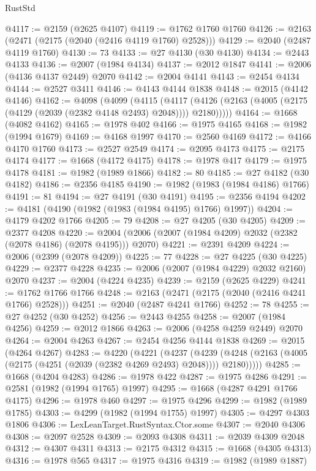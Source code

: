\begin{lexlean}{RustStd}
\begin{coremodule}
@4117 := @2159 (@2625 @4107)
@4119 := @1762 @1760 @1760
@4126 := @2163 (@2471 (@2175 (@2040 (@2416 @4119 @1760) @2528)))
@4129 := @2040 (@2487 @4119 @1760)
@4130 := 73
@4133 := @27 @4130 (@30 @4130)
@4134 := @2443 @4133
@4136 := @2007 (@1984 @4134)
@4137 := @2012 @1847
@4141 := @2006 (@4136 @4137 @2449) @2070
@4142 := @2004 @4141
@4143 := @2454 @4134
@4144 := @2527 @3411
@4146 := @4143 @4144 @1838
@4148 := @2015 (@4142 @4146)
@4162 := @4098
    (@4099
      (@4115
        (@4117 (@4126 (@2163 (@4005 (@2175 (@4129 (@2039 (@2382 @4148 @2493) @2048)))) @2180)))))
@4164 := @1668 (@4082 @4162)
@4165 := @1978 @402
@4166 := @1975 @4165
@4168 := @1982 (@1994 @1679)
@4169 := @4168 @1997
@4170 := @2560 @4169
@4172 := @4166 @4170 @1760
@4173 := @2527 @2549
@4174 := @2095 @4173
@4175 := @2175 @4174
@4177 := @1668 (@4172 @4175)
@4178 := @1978 @417
@4179 := @1975 @4178
@4181 := @1982 (@1989 @1866)
@4182 := 80
@4185 := @27 @4182 (@30 @4182)
@4186 := @2356 @4185
@4190 := @1982 (@1983 (@1984 @4186) @1766)
@4191 := 81
@4194 := @27 @4191 (@30 @4191)
@4195 := @2356 @4194
@4202 := @4181 (@4190 (@1982 (@1983 (@1984 @4195) @1766) @1997))
@4204 := @4179 @4202 @1766
@4205 := 79
@4208 := @27 @4205 (@30 @4205)
@4209 := @2377 @4208
@4220 := @2004 (@2006 (@2007 (@1984 @4209) @2032 (@2382 (@2078 @4186) (@2078 @4195))) @2070)
@4221 := @2391 @4209
@4224 := @2006 (@2399 (@2078 @4209))
@4225 := 77
@4228 := @27 @4225 (@30 @4225)
@4229 := @2377 @4228
@4235 := @2006 (@2007 (@1984 @4229) @2032 @2160) @2070
@4237 := @2004 (@4224 @4235)
@4239 := @2159 (@2625 @4229)
@4241 := @1762 @1766 @1766
@4248 := @2163 (@2471 (@2175 (@2040 (@2416 @4241 @1766) @2528)))
@4251 := @2040 (@2487 @4241 @1766)
@4252 := 78
@4255 := @27 @4252 (@30 @4252)
@4256 := @2443 @4255
@4258 := @2007 (@1984 @4256)
@4259 := @2012 @1866
@4263 := @2006 (@4258 @4259 @2449) @2070
@4264 := @2004 @4263
@4267 := @2454 @4256 @4144 @1838
@4269 := @2015 (@4264 @4267)
@4283 := @4220
    (@4221
      (@4237
        (@4239 (@4248 (@2163 (@4005 (@2175 (@4251 (@2039 (@2382 @4269 @2493) @2048)))) @2180)))))
@4285 := @1668 (@4204 @4283)
@4286 := @1978 @422
@4287 := @1975 @4286
@4291 := @2581 (@1982 (@1994 @1765) @1997)
@4295 := @1668 (@4287 @4291 @1766 @4175)
@4296 := @1978 @460
@4297 := @1975 @4296
@4299 := @1982 (@1989 @1785)
@4303 := @4299 (@1982 (@1994 @1755) @1997)
@4305 := @4297 @4303 @1806
@4306 := LexLeanTarget.RustSyntax.Ctor.some
@4307 := @2040 @4306
@4308 := @2097 @2528
@4309 := @2093 @4308
@4311 := @2039 @4309 @2048
@4312 := @4307 @4311
@4313 := @2175 @4312
@4315 := @1668 (@4305 @4313)
@4316 := @1978 @565
@4317 := @1975 @4316
@4319 := @1982 (@1989 @1887)

\end{coremodule}
\end{lexlean}
